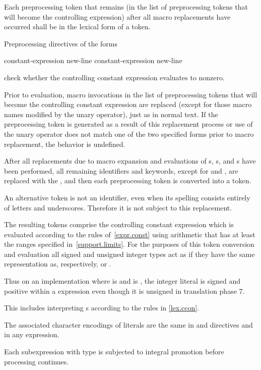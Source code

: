 \pnum
Each preprocessing token that remains (in the list of preprocessing tokens that
will become the controlling expression)
after all macro replacements have occurred
shall be in the lexical form of a token.

\pnum
Preprocessing directives of the forms
\begin{ncsimplebnf}\obeyspaces
{}%
 constant-expression new-line \br
{}%
 constant-expression new-line 
\end{ncsimplebnf}
check whether the controlling constant expression evaluates to nonzero.

\pnum
Prior to evaluation,
macro invocations in the list of preprocessing tokens
that will become the controlling constant expression
are replaced
(except for those macro names modified by the
unary operator),
just as in normal text.
If the preprocessing token
is generated as a result of this replacement process
or use of the
unary operator does not match one of the two specified forms
prior to macro replacement,
the behavior is undefined.

\pnum
After all replacements due to macro expansion and
evaluations of
s,
s, and
s
have been performed,
all remaining identifiers and keywords,
except for
and
,
are replaced with the 
,
and then each preprocessing token is converted into a token.
\begin{note}
An alternative
token is not an identifier,
even when its spelling consists entirely of letters and underscores.
Therefore it is not subject to this replacement.
\end{note}

\pnum
The resulting tokens comprise the controlling constant expression
which is evaluated according to the rules of~\ref{expr.const}
using arithmetic that has at least the ranges specified
in~\ref{support.limits}. For the purposes of this token conversion and evaluation
all signed and unsigned integer types
act as if they have the same representation as, respectively,
 or .
\begin{note}
Thus on an
implementation where  is 
and  is ,
the integer literal  is signed and positive within a 
expression even though it is unsigned in translation phase
7.
\end{note}
This includes interpreting s
according to the rules in \ref{lex.ccon}.
\begin{note}
The associated character encodings of literals are the same
in  and  directives and in any expression.
\end{note}
Each subexpression with type
is subjected to integral promotion before processing continues.

